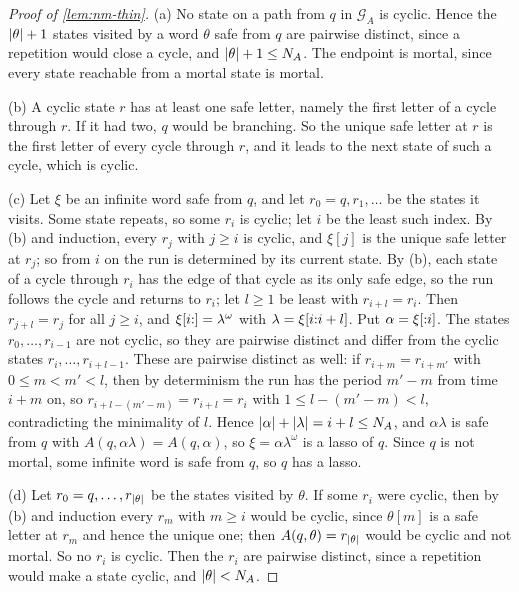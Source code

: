 \begin{proof}[Proof of \cref{lem:nm-thin}]
(a) No state on a path from $q$ in $\mathcal G_A$ is cyclic. Hence the
$\lvert \theta\rvert+1$ states visited by a word $\theta$ safe from $q$ are pairwise
distinct, since a repetition would close a cycle, and $\lvert \theta\rvert+1\le N_A$.
The endpoint is mortal, since every state reachable from a mortal state is
mortal.

(b) A cyclic state $r$ has at least one safe letter, namely the first letter
of a cycle through $r$. If it had two, $q$ would be branching. So the unique
safe letter at $r$ is the first letter of every cycle through $r$, and it leads
to the next state of such a cycle, which is cyclic.

(c) Let $\xi$ be an infinite word safe from $q$, and let $r_0=q,r_1,\dots$ be
the states it visits. Some state repeats, so some $r_i$ is cyclic; let $i$ be
the least such index. By (b) and induction, every $r_j$ with $j\ge i$ is cyclic,
and $\xi[j]$ is the unique safe letter at $r_j$; so from $i$ on the run is
determined by its current state. By (b), each state of a cycle through $r_i$
has the edge of that cycle as its only safe edge, so the run follows the
cycle and returns to $r_i$; let $l\ge1$ be least with $r_{i+l}=r_i$. Then
$r_{j+l}=r_j$ for all $j\ge i$, and $\xi[i{:}]=\lambda^\omega$ with
$\lambda=\xi[i{:}i+l]$. Put $\alpha=\xi[{:}i]$. The states
$r_0,\dots,r_{i-1}$ are not cyclic, so they are pairwise distinct and differ
from the cyclic states $r_i,\dots,r_{i+l-1}$. These are pairwise distinct as
well: if $r_{i+m}=r_{i+m'}$ with $0\le m<m'<l$, then by determinism the run has
the period $m'-m$ from time $i+m$ on, so $r_{i+l-(m'-m)}=r_{i+l}=r_i$ with
$1\le l-(m'-m)<l$, contradicting the minimality of $l$. Hence
$\lvert \alpha\rvert+\lvert \lambda\rvert=i+l\le N_A$, and $\alpha\lambda$ is safe from $q$ with
$A(q,\alpha\lambda)=A(q,\alpha)$, so $\xi=\alpha\lambda^\omega$ is a lasso of
$q$. Since $q$ is not mortal, some infinite word is safe from $q$, so $q$ has a
lasso.

(d) Let $r_0=q,\dots,r_{\lvert \theta\rvert}$ be the states visited by $\theta$. If some
$r_i$ were cyclic, then by (b) and induction every $r_m$ with $m\ge i$ would be
cyclic, since $\theta[m]$ is a safe letter at $r_m$ and hence the unique one;
then $A(q,\theta)=r_{\lvert \theta\rvert}$ would be cyclic and not mortal. So no $r_i$ is
cyclic. Then the $r_i$ are pairwise distinct, since a repetition would make a
state cyclic, and $\lvert \theta\rvert<N_A$.
\end{proof}

